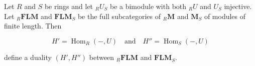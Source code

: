 Let $R$ and $S$ be rings and let ${}_R U_S$ be a bimodule with both ${}_R U$ and $U_S$ injective. Let ${}_R \mathbf{FLM}$ and $\mathbf{FLM}_S$ be the full subcategories of ${}_R \mathbf{M}$ and $\mathbf{M}_S$ of modules of finite length. Then

$$H' = \operatorname{Hom}_R(-, U) \quad \text{and} \quad H'' = \operatorname{Hom}_S(-, U)$$

define a duality $(H', H'')$ between ${}_R \mathbf{FLM}$ and $\mathbf{FLM}_S$.
